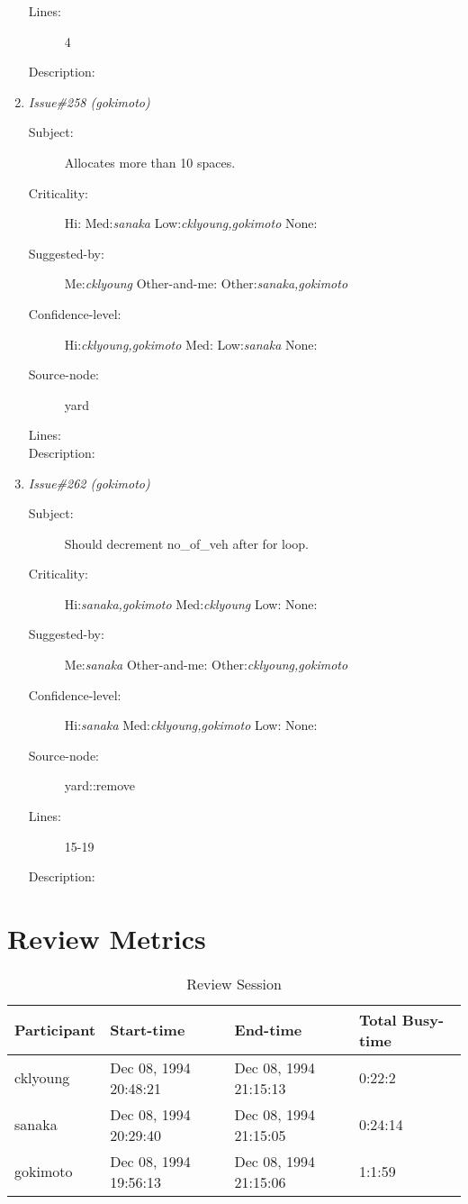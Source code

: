 \begin{enumerate}
\begin{description}
\item [Lines:] 4

\item [Description:] 
\end{description}
\item {\it Issue\#258 (gokimoto)}
\begin{description}
\item [Subject:] Allocates more than 10 spaces.
\item [Criticality:] Hi:{\it } Med:{\it sanaka} Low:{\it cklyoung,gokimoto} None:{\it }
\item [Suggested-by:] Me:{\it cklyoung} Other-and-me:{\it } Other:{\it sanaka,gokimoto}
\item [Confidence-level:] Hi:{\it cklyoung,gokimoto} Med:{\it } Low:{\it sanaka} None:{\it }
\item [Source-node:] yard

\item [Lines:] 

\item [Description:] 
\end{description}
\item {\it Issue\#262 (gokimoto)}
\begin{description}
\item [Subject:] Should decrement no\_of\_veh after for loop.
\item [Criticality:] Hi:{\it sanaka,gokimoto} Med:{\it cklyoung} Low:{\it } None:{\it }
\item [Suggested-by:] Me:{\it sanaka} Other-and-me:{\it } Other:{\it cklyoung,gokimoto}
\item [Confidence-level:] Hi:{\it sanaka} Med:{\it cklyoung,gokimoto} Low:{\it } None:{\it }
\item [Source-node:] yard::remove

\item [Lines:] 15-19

\item [Description:] 
\end{description}
\end{enumerate}
\section{Review Metrics}
\begin{table}[hb]
\begin{center}
\begin{tabular}{|l|l|l|l|}
\hline
Participant & Start-time & End-time & Total Busy-time \\
\hline
cklyoung & Dec 08, 1994 20:48:21 & Dec 08, 1994 21:15:13 & 0:22:2 \\
sanaka & Dec 08, 1994 20:29:40 & Dec 08, 1994 21:15:05 & 0:24:14 \\
gokimoto & Dec 08, 1994 19:56:13 & Dec 08, 1994 21:15:06 & 1:1:59 \\
\hline
\end{tabular}
\end{center}
\caption{Review Session}
\end{table}


